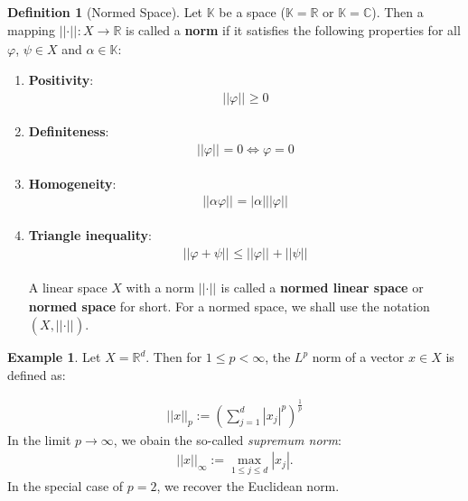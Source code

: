 \documentclass[12pt, a4paper]{article}
\numberwithin{equation}{section}
\theoremstyle{definition}
\theoremstyle{definition}
\newtheorem{defn}[thm]{Definition} %
\newtheorem{exmp}[thm]{Example} %
\newcommand{\norm}[2]{\left\vert\left\vert #1 \right\vert\right\vert_{#2}}
\newcommand{\abs}[1]{\left\vert #1 \right\vert}
\begin{document}
	\begin{defn}[Normed Space]\label{defn:normed_space}
		Let $\mathbb K$ be a space ($\mathbb{K} = \mathbb{R}$ or $\mathbb{K} = \mathbb{C}$). Then a mapping $\norm{\cdot}{}: X\to\mathbb{R}$ is called a \textbf{norm} if it satisfies the following properties for all $\varphi$, $\psi\in X$ and $\alpha\in \mathbb{K}$:
		
		\begin{enumerate}
			\item \textbf{Positivity}:
			\begin{align}
				\norm{\varphi}{} \geq 0
			\end{align}

			\item \textbf{Definiteness}:
			\begin{align}
				\norm{\varphi}{} = 0 \Leftrightarrow \varphi = 0
			\end{align}
		
			\item \textbf{Homogeneity}:
			\begin{align}
				\norm{\alpha\varphi}{} = \abs{\alpha}\norm{\varphi}{}
			\end{align}
		
			\item \textbf{Triangle inequality}:
			\begin{align}
				\norm{\varphi + \psi}{} \leq \norm{\varphi}{} + \norm{\psi}{}
			\end{align}
			
			A linear space $X$ with a norm $\norm{\cdot}{}$ is called a \textbf{normed linear space} or \textbf{normed space} for short. For a normed space, we shall use the notation $\left(X, \norm{\cdot}{}\right)$.
			
		\end{enumerate}
	\end{defn}

	\begin{exmp}\label{exmp:lp-norm-vectors}
		Let $X = \mathbb{R}^d$. Then for $1 \leq p < \infty$, the $L^p$ norm of a vector $x\in X$ is defined as:
		
		\begin{align}\label{eq:L^p_norm}
			\norm{x}{p} := \left(\sum_{j=1}^{d}\abs{x_j}^p\right)^{\frac{1}{p}}
		\end{align}
		In the limit $p\to\infty$, we obain the so-called \textit{supremum norm}:
		\begin{align}\label{eq:sup_norm}
			\norm{x}{\infty} := \max_{1\leq j\leq d}{\abs{x_j}}.
		\end{align} 
		In the special case of $p = 2$, we recover the Euclidean norm.
	\end{exmp}
	
\end{document}
